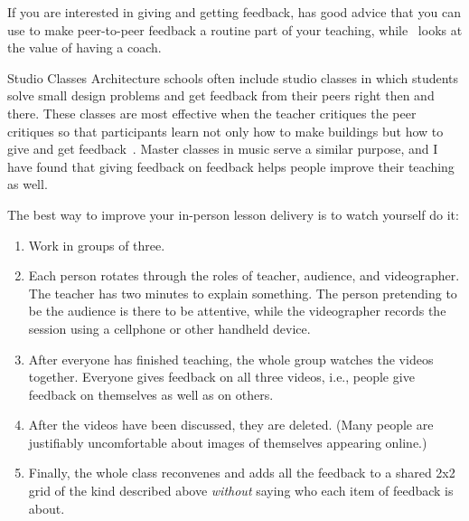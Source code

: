 If you are interested in giving and getting feedback,
\cite{Gorm2014} has good advice
that you can use to make peer-to-peer feedback a routine part of your teaching,
while~\cite{Gawa2011} looks at the value of having a coach.

\begin{aside}{Studio Classes}
  Architecture schools often include studio classes
  in which students solve small design problems
  and get feedback from their peers right then and there.
  These classes are most effective when the teacher critiques the peer critiques
  so that participants learn not only how to make buildings
  but how to give and get feedback~\cite{Scho1984}.
  Master classes in music serve a similar purpose,
  and I have found that giving feedback on feedback
  helps people improve their teaching as well.
\end{aside}


The best way to improve your in-person lesson delivery
is to watch yourself do it:

\begin{enumerate}

\item
  Work in groups of three.

\item
  Each person rotates through the roles of teacher, audience, and videographer.
  The teacher has two minutes to explain something.
  The person pretending to be the audience is there to be attentive,
  while the videographer records the session using a cellphone or other handheld device.

\item
  After everyone has finished teaching,
  the whole group watches the videos together.
  Everyone gives feedback on all three videos,
  i.e., people give feedback on themselves as well as on others.

\item
  After the videos have been discussed,
  they are deleted.
  (Many people are justifiably uncomfortable about images of themselves appearing online.)

\item
  Finally,
  the whole class reconvenes
  and adds all the feedback to a shared 2x2 grid of the kind described above
  \emph{without} saying who each item of feedback is about.

\end{enumerate}

